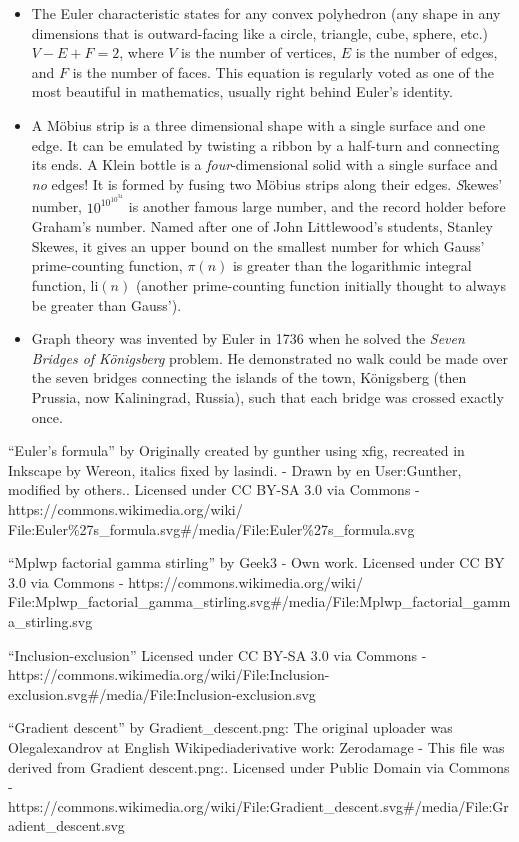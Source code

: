 \documentclass[11pt]{amsart}
\begin{document}
\begin{itemize}
\item The Euler characteristic states for any convex polyhedron (any shape in any dimensions that is outward-facing like a circle, triangle, cube, sphere, etc.) $V - E + F = 2$, where $V$ is the number of vertices, $E$ is the number of edges, and $F$ is the number of faces. This equation is regularly voted as one of the most beautiful in mathematics, usually right behind Euler's identity.
\item A M\"obius strip is a three dimensional shape with a single surface and one edge. It can be emulated by twisting a ribbon by a half-turn and connecting its ends. A Klein bottle is a \emph{four}-dimensional solid with a single surface and \emph{no} edges! It is formed by fusing two M\"obius strips along their edges.
\emph Skewes' number, $10^{10^{10^{34}}}$ is another famous large number, and the record holder before Graham's number. Named after one of John Littlewood's students, Stanley Skewes, it gives an upper bound on the smallest number for which Gauss' prime-counting function, $\pi(n)$ is greater than the logarithmic integral function, $\text{li}(n)$ (another prime-counting function initially thought to always be greater than Gauss').
\item Graph theory was invented by Euler in 1736 when he solved the \emph{Seven Bridges of K\"onigsberg} problem. He demonstrated no walk could be made over the seven bridges connecting the islands of the town, K\"onigsberg (then Prussia, now Kaliningrad, Russia), such that each bridge was crossed exactly once.
\end{itemize}

\begin{thebibliography}{9}

``Euler's formula'' by Originally created by gunther using xfig, recreated in Inkscape by Wereon, italics fixed by lasindi. - Drawn by en User:Gunther, modified by others.. Licensed under CC BY-SA 3.0 via Commons - https://commons.wikimedia.org/wiki/\\File:Euler\%27s\_formula.svg\#/media/File:Euler\%27s\_formula.svg

``Mplwp factorial gamma stirling'' by Geek3 - Own work. Licensed under CC BY 3.0 via Commons - https://commons.wikimedia.org/wiki/\\File:Mplwp\_factorial\_gamma\_stirling.svg\#/media/File:Mplwp\_factorial\_gamma\_stirling.svg

``Inclusion-exclusion'' Licensed under CC BY-SA 3.0 via Commons - \\https://commons.wikimedia.org/wiki/File:Inclusion-exclusion.svg\#/media/File:Inclusion-exclusion.svg

``Gradient descent'' by Gradient\_descent.png: The original uploader was Olegalexandrov at English Wikipediaderivative work: Zerodamage - This file was derived from Gradient descent.png:. Licensed under Public Domain via Commons - \\https://commons.wikimedia.org/wiki/File:Gradient\_descent.svg\#/media/File:Gradient\_descent.svg

\end{thebibliography}
\end{document}
